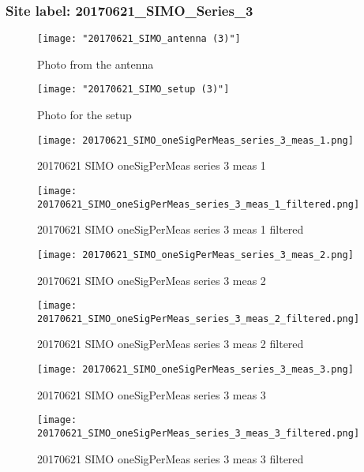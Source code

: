 \subsubsection{Site label: 20170621\_SIMO\_Series\_3}
\begin{figure}[ht] \caption{Photo from the antenna}
\texttt{[image: "20170621\_SIMO\_antenna (3)"]}\centering\end{figure}
\begin{figure}[ht] \caption{Photo for the setup}
\texttt{[image: "20170621\_SIMO\_setup (3)"]}\centering\end{figure}
\begin{figure}[ht] \caption{20170621 SIMO oneSigPerMeas series 3 meas 1}
\texttt{[image: 20170621\_SIMO\_oneSigPerMeas\_series\_3\_meas\_1.png]}\centering\end{figure}
\begin{figure}[ht] \caption{20170621 SIMO oneSigPerMeas series 3 meas 1 filtered}
\texttt{[image: 20170621\_SIMO\_oneSigPerMeas\_series\_3\_meas\_1\_filtered.png]}\centering\end{figure}
\begin{figure}[ht] \caption{20170621 SIMO oneSigPerMeas series 3 meas 2}
\texttt{[image: 20170621\_SIMO\_oneSigPerMeas\_series\_3\_meas\_2.png]}\centering\end{figure}
\begin{figure}[ht] \caption{20170621 SIMO oneSigPerMeas series 3 meas 2 filtered}
\texttt{[image: 20170621\_SIMO\_oneSigPerMeas\_series\_3\_meas\_2\_filtered.png]}\centering\end{figure}
\begin{figure}[ht] \caption{20170621 SIMO oneSigPerMeas series 3 meas 3}
\texttt{[image: 20170621\_SIMO\_oneSigPerMeas\_series\_3\_meas\_3.png]}\centering\end{figure}
\begin{figure}[ht] \caption{20170621 SIMO oneSigPerMeas series 3 meas 3 filtered}
\texttt{[image: 20170621\_SIMO\_oneSigPerMeas\_series\_3\_meas\_3\_filtered.png]}\centering\end{figure}
\clearpage
